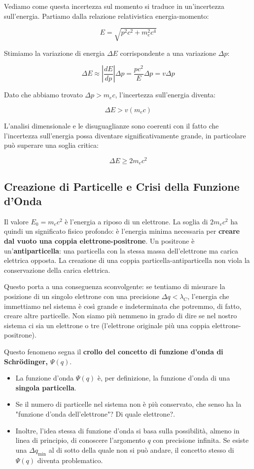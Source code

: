 Vediamo come questa incertezza sul momento si traduce in un'incertezza sull'energia. Partiamo dalla relazione relativistica energia-momento:

$$
E = \sqrt{p^2 c^2 + m_e^2 c^4}
$$

Stimiamo la variazione di energia $\Delta E$ corrispondente a una variazione $\Delta p$:

$$
\Delta E \approx \left| \frac{dE}{dp} \right| \Delta p = \frac{p c^2}{E} \Delta p = v \Delta p
$$

Dato che abbiamo trovato $\Delta p > m_e c$, l'incertezza sull'energia diventa:

$$
\Delta E > v (m_e c)
$$

L'analisi dimensionale e le disuguaglianze sono coerenti con il fatto che l'incertezza sull'energia possa diventare significativamente grande, in particolare può superare una soglia critica:

$$
\Delta E \ge 2 m_e c^2
$$

\subsection{Creazione di Particelle e Crisi della Funzione d'Onda}

Il valore $E_0 = m_e c^2$ è l'energia a riposo di un elettrone. La soglia di $2 m_e c^2$ ha quindi un significato fisico profondo: è l'energia minima necessaria per \textbf{creare dal vuoto una coppia elettrone-positrone}. Un positrone è un'\textbf{antiparticella}: una particella con la stessa massa dell'elettrone ma carica elettrica opposta. La creazione di una coppia particella-antiparticella non viola la conservazione della carica elettrica.

Questo porta a una conseguenza sconvolgente: se tentiamo di misurare la posizione di un singolo elettrone con una precisione $\Delta q < \lambda_C$, l'energia che immettiamo nel sistema è così grande e indeterminata che potremmo, di fatto, creare altre particelle. Non siamo più nemmeno in grado di dire se nel nostro sistema ci sia un elettrone o tre (l'elettrone originale più una coppia elettrone-positrone).

Questo fenomeno segna il \textbf{crollo del concetto di funzione d'onda di Schrödinger, $\Psi(q)$}.
\begin{itemize}
    \item La funzione d'onda $\Psi(q)$ è, per definizione, la funzione d'onda di una \textbf{singola particella}.
    \item Se il numero di particelle nel sistema non è più conservato, che senso ha la "funzione d'onda dell'elettrone"? Di quale elettrone?.
    \item Inoltre, l'idea stessa di funzione d'onda si basa sulla possibilità, almeno in linea di principio, di conoscere l'argomento $q$ con precisione infinita. Se esiste una $\Delta q_{\min}$ al di sotto della quale non si può andare, il concetto stesso di $\Psi(q)$ diventa problematico.
\end{itemize}


